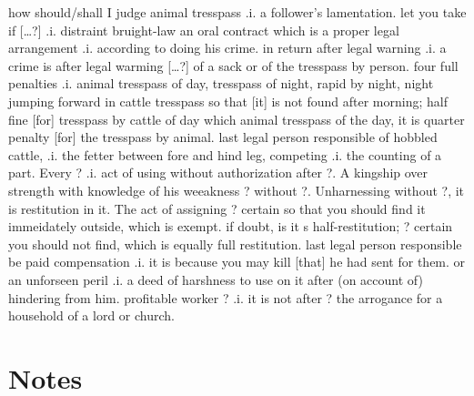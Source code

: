 \documentclass[11pt]{article}
\begin{document}
\begin{pages}
 \begin{Rightside}
    \beginnumbering
    \pstart  
    how should/shall I judge animal tresspass .i. a follower's lamentation.  let you take if [\ldots?] .i. distraint bruight-law an oral contract which is a proper legal arrangement .i. according to doing his crime.  in return after legal warning .i. a crime is after legal warming [\ldots?] of a sack or of the tresspass by person.  four full penalties .i. animal tresspass of day, tresspass of night, rapid by night, night jumping forward in cattle tresspass so that [it] is not found after morning;  half fine [for] tresspass by cattle of day which animal tresspass of the day, it is quarter penalty [for] the tresspass by animal.  last legal person responsible of hobbled cattle, .i. the fetter between fore and hind leg, competing .i. the counting of a part. Every ? .i. act of using without authorization after ?. A kingship over strength with knowledge of his weeakness ? without ?.  Unharnessing without ?, it is restitution in it.  The act of assigning ? certain so that you should find it immeidately outside, which is exempt.  if doubt, is it s half-restitution; ? certain you should not find, which is equally full restitution.  last legal person responsible be paid compensation .i. it is because you may kill [that] he had sent for them.  or an unforseen peril .i. a deed of harshness to use on it after (on account of) hindering from him. profitable worker ? .i. it is not after ? the arrogance for a household of a lord or church.
    \pend
    \endnumbering
  \end{Rightside}

  \Pages
\end{pages}

\section{Notes}
\end{document}
